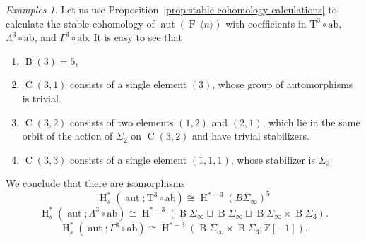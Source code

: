 \documentclass[psamsfonts]{amsart}
\theoremstyle{plain}
\theoremstyle{definition}
\theoremstyle{remark}
\newtheorem{exmps}[thm]{Examples}
\newcommand{\Z}{\mathbb{Z}}
\newcommand{\aut}{\operatorname{aut}}
\newcommand{\classifying}{\operatorname{B}}
\newcommand{\free}[1]{\operatorname{F}\,\langle #1\rangle}
\newcommand{\HH}{\operatorname{H}} %
\newcommand{\abelianization}{\mathrm{ab}}
\newcommand{\tensor}{\mathrm{T}}
\DeclareMathOperator{\Comp}{C}
\DeclareMathOperator{\Bell}{B}
\begin{document}
\begin{exmps}
Let us use Proposition~\ref{prop:stable cohomology calculations} to calculate the stable cohomology of $\aut(\free{n})$ with coefficients in $\tensor^3\circ \abelianization$, $\Lambda^3\circ \abelianization$, and $\Gamma^3\circ \abelianization$. It is easy to see that 
\begin{enumerate}
\item $\Bell(3)=5$, 
\item $\Comp(3, 1)$ consists of a single element $(3)$, whose group of automorphisms is trivial.
\item $\Comp(3, 2)$ consists of two elements $(1, 2)$ and $(2,1)$, which lie in the same orbit of the action of $\Sigma_2$ on $\Comp(3, 2)$ and have trivial stabilizers.
\item $\Comp(3, 3)$ consists of a single element $(1, 1, 1)$, whose stabilizer is $\Sigma_3$
\end{enumerate}
We conclude that there are isomorphisms
\[
\HH^*_s(\aut; \tensor^3\circ \abelianization)\cong \HH^{*-3}(B\Sigma_\infty)^5
\]
\[
\HH^*_s(\aut; \Lambda^3\circ \abelianization)\cong \HH^{*-3}(\classifying\Sigma_\infty\sqcup \classifying\Sigma_\infty \sqcup \classifying\Sigma_\infty\times \classifying\Sigma_3 ).
\]
\[
\HH^*_s(\aut; \Gamma^3\circ \abelianization)\cong \HH^{*-3}(\classifying \Sigma_\infty \times \classifying \Sigma_3; \Z[-1]).
\]
\end{exmps}


\end{document}
